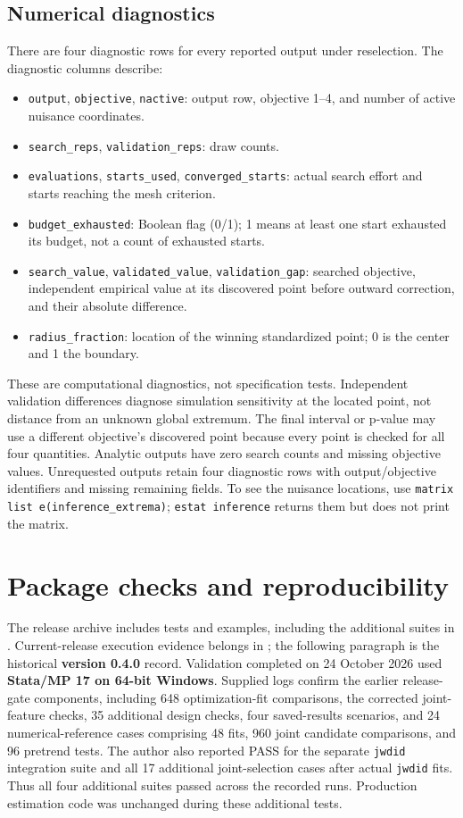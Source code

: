 \documentclass[11pt]{article}
\newcommand{\cmd}[1]{\texttt{#1}}
\begin{document}
\subsection{Numerical diagnostics}
There are four diagnostic rows for every reported output under reselection.
The diagnostic columns describe:
\begin{itemize}
\item \cmd{output}, \cmd{objective}, \cmd{nactive}: output row, objective 1--4,
and number of active nuisance coordinates.
\item \cmd{search\_reps}, \cmd{validation\_reps}: draw counts.
\item \cmd{evaluations}, \cmd{starts\_used}, \cmd{converged\_starts}: actual
search effort and starts reaching the mesh criterion.
\item \cmd{budget\_exhausted}: Boolean flag (0/1); 1 means at least one start exhausted its budget, not a count of exhausted starts.
\item \cmd{search\_value}, \cmd{validated\_value}, \cmd{validation\_gap}:
searched objective, independent empirical value at its discovered point
before outward correction, and their absolute difference.
\item \cmd{radius\_fraction}: location of the winning standardized point;
0 is the center and 1 the boundary.
\end{itemize}
These are computational diagnostics, not specification tests. Independent
validation differences diagnose simulation sensitivity at the located point,
not distance from an unknown global extremum. The final interval or p-value
may use a different objective's discovered point because every point is checked
for all four quantities. Analytic outputs have zero search counts and missing objective values.
Unrequested outputs retain four diagnostic rows with output/objective
identifiers and missing remaining fields. To see the nuisance locations,
use \cmd{matrix list e(inference\_extrema)}; \cmd{estat inference} returns
them but does not print the matrix.

\section{Package checks and reproducibility}
The release archive includes tests and examples, including the additional
suites in . Current-release execution evidence belongs in
; the following paragraph is the historical
\textbf{version 0.4.0} record. Validation completed on 24 October 2026 used
\textbf{Stata/MP 17 on 64-bit Windows}. Supplied logs confirm the earlier
release-gate components, including 648 optimization-fit comparisons, the
corrected joint-feature checks, 35 additional design checks, four
saved-results scenarios, and 24 numerical-reference cases comprising 48 fits,
960 joint candidate comparisons, and 96 pretrend tests. The author also reported
PASS for the separate \cmd{jwdid} integration suite and all 17 additional
joint-selection cases after actual \cmd{jwdid} fits. Thus all four additional
suites passed across the recorded runs. Production estimation code was
unchanged during these additional tests.
\end{document}
